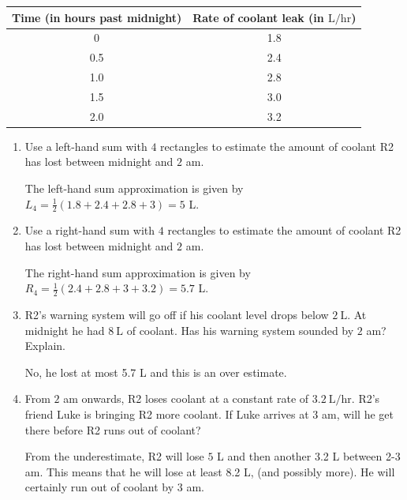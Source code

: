 \documentclass{article}
\begin{document}
\begin{enumerate}
   \begin{tabular}{c | c}
   \hline
   Time (in hours past midnight) & Rate of coolant leak (in $\textrm{L}/\textrm{hr}$) \\
   \hline
   0 & 1.8 \\
   0.5 & 2.4 \\
   1.0 & 2.8 \\
   1.5 & 3.0 \\
   2.0 & 3.2 \\
  \hline
   \end{tabular}

   \begin{enumerate}

   \item  Use a left-hand sum with $4$ rectangles to estimate the amount of coolant R2 has lost between midnight and $2$ am.  
   
\begin{solution}
The left-hand sum approximation is given by $L_4=\frac12(1.8+2.4+2.8+3)=5$ L.
\end{solution}
    \vfill
   \item  Use a right-hand sum with $4$ rectangles to estimate the amount of coolant R2 has lost between midnight and $2$ am. 
   
\begin{solution}  The right-hand sum approximation is given by $R_4=\frac12(2.4+2.8+3+3.2)=5.7$ L.
\end{solution} 
   \vfill
   
   \item R2's warning system will go off if his coolant level drops below $2\ \text{L}$.  At midnight he had $8\ \text{L}$ of coolant.  Has his warning system sounded by $2$ am? Explain.
   
\begin{solution}
No, he lost at most 5.7 L and this is an over estimate.
\end{solution} 
   \vfill

  \item From $2$ am onwards, R2 loses coolant at a constant rate of $3.2\ \text{L}/\text{hr}$.  R2's friend Luke is bringing R2 more coolant.  If Luke arrives at $3$ am, will he get there before R2 runs out of coolant?
  
\begin{solution}   From the underestimate, R2 will lose $5$ L and then another 3.2 L between 2-3 am.  This means that he will lose at least 8.2 L, (and possibly more).  He will certainly run out of coolant by 3 am.\end{solution} 
  \vfill


\end{enumerate}
\end{enumerate}
\end{document}
